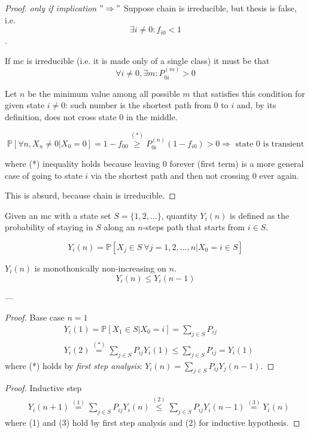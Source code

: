 	\begin{proof} \emph{only if implication} $"\Rightarrow"$
		Suppose chain is irreducible, but thesis is false, i.e.
		$$ \exists i \neq 0 : f_{i0} < 1 $$.

		If \gls{mc} is irreducible (i.e. it is made only of a single class) it must be that
		$$ \forall i \neq 0, \exists m : P_{0i}^{(m)} > 0 $$

		Let $n$ be the minimum value among all possible $m$  that satisfies this condition for given state $i \neq 0$: such number is the shortest path from 0 to $i$ and, by its definition, does not cross state 0 in the middle.

		$$ \mathbb{P}[\forall n, X_n \neq 0 | X_0 = 0] = 1 - f_{00} \stackrel{(*)}{\ge} P_{0i}^{(n)} (1 - f_{i0}) > 0 \Rightarrow \text{ state 0 is transient} $$

		where (*) inequality holds because leaving 0 forever (first term) is a more general case of going to state $i$ via the shortest path and then not crossing 0 ever again.

		This is absurd, because chain is irreducible.
	\end{proof}

	\begin{definition}
		Given an \gls{mc} with a state set $S = \{1, 2, ...\}$, quantity $Y_i(n)$ is defined as the probability of staying in $S$ along an $n$-steps path that starts from $i \in S$.

		$$ Y_i(n) = \mathbb{P}[X_j \in S ~\forall j=1, 2, ..., n | X_0 = i \in S] $$
	\end{definition}

	\begin{theorem}
		$Y_i(n)$ is monothonically non-increasing on $n$.
		$$ Y_i(n) \le Y_i(n-1) $$
	\end{theorem}
	---
	\begin{proof} Base case $n=1$
		\begin{equation}\begin{split} \label{eq:Y_i-properties}
			& Y_i(1) = \mathbb{P}[X_1 \in S | X_0 = i] = \sum_{j \in S} P_{ij} \\
			& Y_i(2) \stackrel{(*)}{=} \sum_{j \in S} P_{ij} Y_i(1) \le \sum_{j \in S} P_{ij} = Y_i(1)
		\end{split}\end{equation}
		where (*) holds by \emph{first step analysis}: $ Y_i(n) = \sum_{j \in S} P_{ij} Y_j(n-1) $.
	\end{proof}

	\begin{proof} Inductive step
		\begin{equation}\begin{split}
			& Y_i(n+1) \stackrel{(1)}{=} \sum_{j \in S} P_{ij} Y_i(n) \stackrel{(2)}{\le} \sum_{j \in S} P_{ij} Y_i(n-1) \stackrel{(3)}{=} Y_i(n)
		\end{split}\end{equation}
		where (1) and (3) hold by first step analysis and (2) for inductive hypothesis.
	\end{proof}

